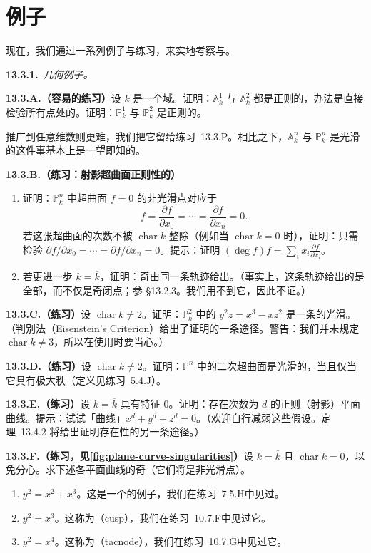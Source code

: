 
\section{例子}

现在，我们通过一系列例子与练习，来实地考察\trRegularity{}与\trSmoothness。

\textbf{13.3.1.}\ \emph{几何例子。}

\textbf{13.3.A.（容易的练习）}\quad 设 $k$ 是一个域。证明：$\mathbb{A}^1_k$ 与 $\mathbb{A}^2_k$ 都是正则的，办法是直接检验所有点处的\trRegularity。证明：$\mathbb{P}^1_k$ 与 $\mathbb{P}^2_k$ 是正则的。

推广到任意维数则更难，我们把它留给\mbox{练习~13.3.P}。相比之下，$\mathbb{A}^n_k$ 与 $\mathbb{P}^n_k$ 是光滑的这件事基本上是一望即知的。

\textbf{13.3.B.（练习：射影超曲面正则性的\trJacobianCriterion）}
\begin{enumerate}[label=(\alph*)]
\item 证明：$\mathbb{P}^n_k$ 中超曲面 $f=0$ 的非光滑点对应于\trLocus
\[
f=\frac{\partial f}{\partial x_0}=\cdots=\frac{\partial f}{\partial x_n}=0.
\]
若这张超曲面的次数不被 $\operatorname{char}k$ 整除（例如当 $\operatorname{char}k=0$ 时），证明：只需检验 $\partial f/\partial x_0=\cdots=\partial f/\partial x_n=0$。提示：证明 $(\deg f)f=\sum_i x_i\frac{\partial f}{\partial x_i}$。
\item 若更进一步 $k=\overline{k}$，证明：奇\trClosedPoint{}由同一条轨迹给出。（事实上，这条轨迹给出的是全部\trSingularPoint，而不仅是奇闭点；参 \S13.2.3。我们用不到它，因此不证。）
\end{enumerate}

\textbf{13.3.C.（练习）}\quad 设 $\operatorname{char}k\neq2$。证明：$\mathbb{P}^2_k$ 中的 $y^2z=x^3-xz^2$ 是一条\trIrreducible{}的光滑\trCurve。（\trEisenstein{}判别法（Eisenstein's Criterion）给出了证明\trIrreducibility{}的一条途径。警告：我们并未规定 $\operatorname{char}k\neq3$，所以在使用\trJacobianCriterion{}时要当心。）

\textbf{13.3.D.（练习）}\quad 设 $\operatorname{char}k\neq2$。证明：$\mathbb{P}^n$ 中的二次超曲面是光滑的，当且仅当它具有极大秩（定义见\mbox{练习~5.4.J}）。

\textbf{13.3.E.（练习）}\quad 设 $k=\overline{k}$ 具有特征 $0$。证明：存在次数为 $d$ 的正则（射影）平面曲线。提示：试试「\trFermat{}曲线」$x^d+y^d+z^d=0$。（欢迎自行减弱这些假设。\trBertini{}定理~13.4.2 将给出证明存在性的另一条途径。）

\textbf{13.3.F.（练习，见\cref{fig:plane-curve-singularities}）}\quad 设 $k=\overline{k}$ 且 $\operatorname{char}k=0$，以免分心。求下述各平面曲线的奇\trClosedPoint（它们将是非光滑点）。
\begin{enumerate}[label=(\alph*)]
\item $y^2=x^2+x^3$。这是一个\emph{\trNode}的例子，我们在\mbox{练习~7.5.H}中见过。
\item $y^2=x^3$。这称为\emph{\trCusp}（cusp），我们在\mbox{练习~10.7.F}中见过它。
\item $y^2=x^4$。这称为\emph{\trTacnode}（tacnode），我们在\mbox{练习~10.7.G}中见过它。
\end{enumerate}

